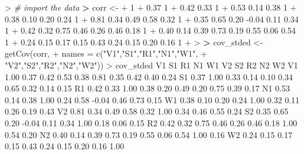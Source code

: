 \documentclass[
]{article}
\newenvironment{Shaded}{\begin{snugshade}}{\end{snugshade}}
\newcommand{\AttributeTok}[1]{\textcolor[rgb]{0.77,0.63,0.00}{#1}}
\newcommand{\CommentTok}[1]{\textcolor[rgb]{0.56,0.35,0.01}{\textit{#1}}}
\newcommand{\ErrorTok}[1]{\textcolor[rgb]{0.64,0.00,0.00}{\textbf{#1}}}
\newcommand{\FloatTok}[1]{\textcolor[rgb]{0.00,0.00,0.81}{#1}}
\newcommand{\FunctionTok}[1]{\textcolor[rgb]{0.00,0.00,0.00}{#1}}
\newcommand{\NormalTok}[1]{#1}
\newcommand{\OtherTok}[1]{\textcolor[rgb]{0.56,0.35,0.01}{#1}}
\newcommand{\SpecialCharTok}[1]{\textcolor[rgb]{0.00,0.00,0.00}{#1}}
\newcommand{\StringTok}[1]{\textcolor[rgb]{0.31,0.60,0.02}{#1}}
\begin{document}
\begin{Shaded}
\begin{Highlighting}[]
\SpecialCharTok{\textgreater{}} \CommentTok{\# import the data}
\ErrorTok{\textgreater{}}\NormalTok{ corr }\OtherTok{\textless{}{-}} \StringTok{\textquotesingle{}}
\StringTok{+ 1}
\StringTok{+ 0.37 1}
\StringTok{+ 0.42  0.33 1}
\StringTok{+ 0.53  0.14 0.38  1}
\StringTok{+ 0.38  0.10  0.20  0.24 1}
\StringTok{+ 0.81  0.34  0.49  0.58 0.32  1}
\StringTok{+ 0.35  0.65 0.20 {-}0.04 0.11  0.34  1}
\StringTok{+ 0.42  0.32 0.75  0.46  0.26 0.46 0.18 1}
\StringTok{+ 0.40  0.14 0.39  0.73  0.19 0.55 0.06 0.54 1}
\StringTok{+ 0.24  0.15 0.17  0.15  0.43 0.24 0.15 0.20  0.16 1}
\StringTok{+ \textquotesingle{}}
\SpecialCharTok{\textgreater{}} 
\ErrorTok{\textgreater{}}\NormalTok{ cov\_stded }\OtherTok{\textless{}{-}} \FunctionTok{getCov}\NormalTok{(corr,}
\SpecialCharTok{+}                     \AttributeTok{names =} \FunctionTok{c}\NormalTok{(}\StringTok{"V1"}\NormalTok{,}\StringTok{"S1"}\NormalTok{,}\StringTok{"R1"}\NormalTok{,}\StringTok{"N1"}\NormalTok{,}\StringTok{"W1"}\NormalTok{,}
\SpecialCharTok{+}                               \StringTok{"V2"}\NormalTok{,}\StringTok{"S2"}\NormalTok{,}\StringTok{"R2"}\NormalTok{,}\StringTok{"N2"}\NormalTok{,}\StringTok{"W2"}\NormalTok{))}
\SpecialCharTok{\textgreater{}}\NormalTok{ cov\_stded}
\NormalTok{     V1   S1   R1    N1   W1   V2    S2   R2   N2   W2}
\NormalTok{V1 }\FloatTok{1.00} \FloatTok{0.37} \FloatTok{0.42}  \FloatTok{0.53} \FloatTok{0.38} \FloatTok{0.81}  \FloatTok{0.35} \FloatTok{0.42} \FloatTok{0.40} \FloatTok{0.24}
\NormalTok{S1 }\FloatTok{0.37} \FloatTok{1.00} \FloatTok{0.33}  \FloatTok{0.14} \FloatTok{0.10} \FloatTok{0.34}  \FloatTok{0.65} \FloatTok{0.32} \FloatTok{0.14} \FloatTok{0.15}
\NormalTok{R1 }\FloatTok{0.42} \FloatTok{0.33} \FloatTok{1.00}  \FloatTok{0.38} \FloatTok{0.20} \FloatTok{0.49}  \FloatTok{0.20} \FloatTok{0.75} \FloatTok{0.39} \FloatTok{0.17}
\NormalTok{N1 }\FloatTok{0.53} \FloatTok{0.14} \FloatTok{0.38}  \FloatTok{1.00} \FloatTok{0.24} \FloatTok{0.58} \SpecialCharTok{{-}}\FloatTok{0.04} \FloatTok{0.46} \FloatTok{0.73} \FloatTok{0.15}
\NormalTok{W1 }\FloatTok{0.38} \FloatTok{0.10} \FloatTok{0.20}  \FloatTok{0.24} \FloatTok{1.00} \FloatTok{0.32}  \FloatTok{0.11} \FloatTok{0.26} \FloatTok{0.19} \FloatTok{0.43}
\NormalTok{V2 }\FloatTok{0.81} \FloatTok{0.34} \FloatTok{0.49}  \FloatTok{0.58} \FloatTok{0.32} \FloatTok{1.00}  \FloatTok{0.34} \FloatTok{0.46} \FloatTok{0.55} \FloatTok{0.24}
\NormalTok{S2 }\FloatTok{0.35} \FloatTok{0.65} \FloatTok{0.20} \SpecialCharTok{{-}}\FloatTok{0.04} \FloatTok{0.11} \FloatTok{0.34}  \FloatTok{1.00} \FloatTok{0.18} \FloatTok{0.06} \FloatTok{0.15}
\NormalTok{R2 }\FloatTok{0.42} \FloatTok{0.32} \FloatTok{0.75}  \FloatTok{0.46} \FloatTok{0.26} \FloatTok{0.46}  \FloatTok{0.18} \FloatTok{1.00} \FloatTok{0.54} \FloatTok{0.20}
\NormalTok{N2 }\FloatTok{0.40} \FloatTok{0.14} \FloatTok{0.39}  \FloatTok{0.73} \FloatTok{0.19} \FloatTok{0.55}  \FloatTok{0.06} \FloatTok{0.54} \FloatTok{1.00} \FloatTok{0.16}
\NormalTok{W2 }\FloatTok{0.24} \FloatTok{0.15} \FloatTok{0.17}  \FloatTok{0.15} \FloatTok{0.43} \FloatTok{0.24}  \FloatTok{0.15} \FloatTok{0.20} \FloatTok{0.16} \FloatTok{1.00}
\end{Highlighting}
\end{Shaded}
\end{document}
